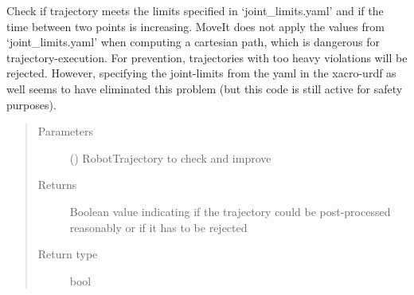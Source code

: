 \documentclass[letterpaper,10pt,english]{sphinxmanual}
\begin{document}
\begin{fulllineitems}
\begin{fulllineitems}
\end{fulllineitems}


\begin{fulllineitems}
\label{\detokenize{module_trajectory_manager:agiprobot_measurement.trajectory_manager.TrajectoryManager.postprocess_trajectory}}
Check if trajectory meets the limits specified in ‘joint\_limits.yaml’ and if the time between two points is increasing.
MoveIt does not apply the values from ‘joint\_limits.yaml’ when computing a cartesian path, which is dangerous for trajectory-execution.
For prevention, trajectories with too heavy violations will be rejected. However, specifying the joint-limits from the yaml in the xacro-urdf as
well seems to have eliminated this problem (but this code is still active for safety purposes).
\begin{quote}\begin{description}
\item[{Parameters}] \leavevmode
{} () \textendash{} RobotTrajectory to check and improve

\item[{Returns}] \leavevmode
Boolean value indicating if the trajectory could be post-processed reasonably or if it has to be rejected

\item[{Return type}] \leavevmode
bool

\end{description}\end{quote}

\end{fulllineitems}



\end{fulllineitems}
\end{document}
